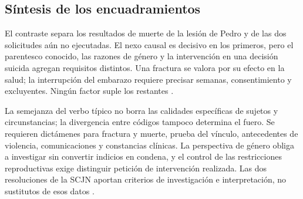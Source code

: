 \documentclass[spanish,letterpaper,oneside]{article}
\begin{document}
\subsection*{Síntesis de los encuadramientos}
El contraste separa los resultados de muerte de la lesión de Pedro y de las dos solicitudes aún no ejecutadas. El nexo causal es decisivo en los primeros, pero el parentesco conocido, las razones de género y la intervención en una decisión suicida agregan requisitos distintos. Una fractura se valora por su efecto en la salud; la interrupción del embarazo requiere precisar semanas, consentimiento y excluyentes. Ningún factor suple los restantes \citep{amuchateguiPenal2012,cpdfS3Consolidado,cpfOficial2026}.

La semejanza del verbo típico no borra las calidades específicas de sujetos y circunstancias; la divergencia entre códigos tampoco determina el fuero. Se requieren dictámenes para fractura y muerte, prueba del vínculo, antecedentes de violencia, comunicaciones y constancias clínicas. La perspectiva de género obliga a investigar sin convertir indicios en condena, y el control de las restricciones reproductivas exige distinguir petición de intervención realizada. Las dos resoluciones de la SCJN aportan criterios de investigación e interpretación, no sustitutos de esos datos \citep{scjnAR5542013,scjnAR2672023}.
\end{document}
